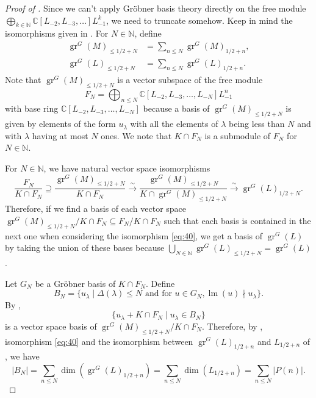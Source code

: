\documentclass[a4paper, 12pt, reqno]{amsart}
\theoremstyle{remark}
\numberwithin{equation}{subsection}
\DeclareMathOperator{\gr}{gr}
\DeclareMathOperator{\lm}{lm}
\begin{document}
\begin{proof}[Proof of ]
  Since we can't apply Gr\"{o}bner basis theory directly on the free module $\bigoplus_{k \in \mathbb{N}}\mathbb{C}[L_{-2}, L_{-3}, \dots]L_{-1}^k$, we need to truncate somehow.
  Keep in mind the isomorphisms given in .
  For $N \in \mathbb{N}$, define
  \begin{align*}
    \gr^G(M)_{\le 1/2 + N} &= \sum_{n \le N}\gr^G(M)_{1/2 + n}, \\
    \gr^G(L)_{\le 1/2 + N} &= \sum_{n \le N}\gr^G(L)_{1/2 + n}.
  \end{align*}
  Note that $\gr^G(M)_{\le 1/2 + N}$ is a vector subspace of the free module
  \begin{equation*}
    F_N = \bigoplus_{n \le N}\mathbb{C}[L_{-2}, L_{-3}, \dots, L_{-N}]L_{-1}^n
  \end{equation*}
  with base ring $\mathbb{C}[L_{-2}, L_{-3}, \dots, L_{-N}]$ because a basis of $\gr^G(M)_{\le 1/2 + N}$ is given by elements of the form $u_{\lambda}$ with all the elements of $\lambda$ being less than $N$ and with $\lambda$ having at most $N$ ones.
  We note that $K \cap F_N$ is a submodule of $F_N$ for $N \in \mathbb{N}$.

  For $N \in \mathbb{N}$, we have natural vector space isomorphisms
  \begin{equation}
    \label{eq:40}
    \frac{F_N}{K \cap F_N} \supseteq \frac{\gr^G(M)_{\le 1/2 + N}}{K \cap F_N} \xrightarrow{\sim} \frac{\gr^G(M)_{\le 1/2 + N}}{K \cap \gr^G(M)_{\le 1/2 + N}} \xrightarrow{\sim} \gr^G(L)_{1/2 + N}.
  \end{equation}
  Therefore, if we find a basis of each vector space $\gr^G(M)_{\le 1/2 + N}/K \cap F_N \subseteq F_N/K \cap F_N$ such that each basis is contained in the next one when considering the isomorphism \eqref{eq:40}, we get a basis of $\gr^G(L)$ by taking the union of these bases because $\bigcup_{N \in \mathbb{N}}\gr^G(L)_{\le 1/2 + N} = \gr^G(L)$.

  Let $G_N$ be a Gr\"{o}bner basis of $K \cap F_N$.
  Define
  \begin{equation*}
    B_N = \{u_{\lambda} \mid \Delta(\lambda) \le N\text{ and for }u \in G_N, \lm(u) \nmid u_{\lambda}\}.
  \end{equation*}
  By \cite[Proposition 3.6.4]{adams_introduction_1994},
  \begin{equation}
    \label{eq:41}
    \{u_{\lambda} + K \cap F_N \mid u_{\lambda} \in B_N\}
  \end{equation}
  is a vector space basis of $\gr^G(M)_{\le 1/2 + N}/K \cap F_N$.
  Therefore, by , isomorphism \eqref{eq:40} and the isomorphism between $\gr^G(L)_{1/2 + n}$ and $L_{1/2 + n}$ of , we have
  \begin{equation*}
    |B_N| = \sum_{n \le N}\dim(\gr^G(L)_{1/2 + n}) = \sum_{n \le N}\dim(L_{1/2 + n}) = \sum_{n \le N}|P(n)|.
  \end{equation*}


\end{proof}
\end{document}
